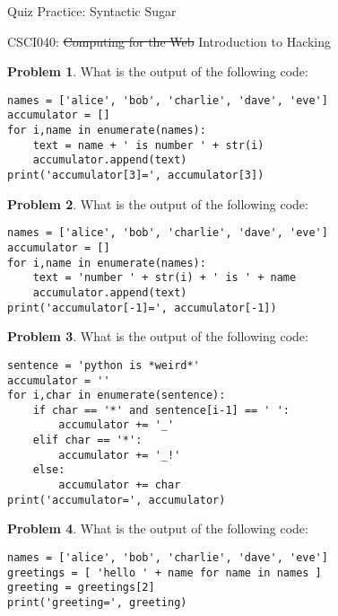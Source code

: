 \documentclass[10pt]{article}
\theoremstyle{definition}
\newtheorem{problem}{Problem}
\begin{document}
\begin{center}
    {
\Large
    Quiz Practice: Syntactic Sugar
}

    \vspace{0.1in}
    CSCI040: \sout{Computing for the Web} Introduction to Hacking

    \vspace{0.1in}
\end{center}


\begin{problem}
    What is the output of the following code:
\end{problem}
\begin{lstlisting}
names = ['alice', 'bob', 'charlie', 'dave', 'eve']
accumulator = []
for i,name in enumerate(names):
    text = name + ' is number ' + str(i)
    accumulator.append(text)
print('accumulator[3]=', accumulator[3])
\end{lstlisting}
\vspace{1.5in}

\begin{problem}
    What is the output of the following code:
\end{problem}
\begin{lstlisting}
names = ['alice', 'bob', 'charlie', 'dave', 'eve']
accumulator = []
for i,name in enumerate(names):
    text = 'number ' + str(i) + ' is ' + name
    accumulator.append(text)
print('accumulator[-1]=', accumulator[-1])
\end{lstlisting}
\vspace{1.5in}

\begin{problem}
    What is the output of the following code:
\end{problem}
\begin{lstlisting}
sentence = 'python is *weird*'
accumulator = ''
for i,char in enumerate(sentence):
    if char == '*' and sentence[i-1] == ' ':
        accumulator += '_'
    elif char == '*':
        accumulator += '_!'
    else:
        accumulator += char
print('accumulator=', accumulator)
\end{lstlisting}
\vspace{1.5in}

\begin{problem}
    What is the output of the following code:
\end{problem}
\begin{lstlisting}
names = ['alice', 'bob', 'charlie', 'dave', 'eve']
greetings = [ 'hello ' + name for name in names ]
greeting = greetings[2]
print('greeting=', greeting)
\end{lstlisting}
\vspace{1.5in}
\end{document}
